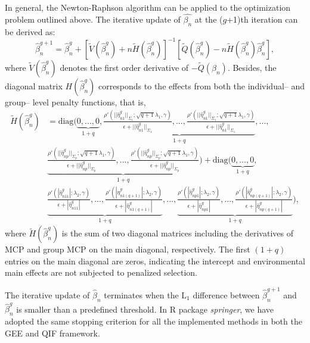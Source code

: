 \documentclass[12pt]{article}
\begin{document}
In general, the Newton-Raphson algorithm can be applied to the optimization problem outlined above. The iterative update of $\hat{\beta_n}$ at the ($g$+1)th iteration can be derived as:
\begin{equation*}
\hat{\beta}_n^{g+1}=\hat{\beta}_n^{g}+[\tilde{V}(\hat{\beta}_n^{g})+n\tilde{H}(\hat{\beta}_n^{g})]^{-1}[\tilde{Q}(\hat{\beta}_n^{g})-n\tilde{H}(\hat{\beta}_n^{g})\hat{\beta}_n^{g}],
\end{equation*}
where  $\tilde{V}(\hat{\beta}_n^{g})$ denotes the first order derivative of $-\tilde{Q}(\beta_n)$. Besides, the diagonal matrix $H(\hat{\beta}_n^{g})$ corresponds to the effects from both the individual-- and group-- level penalty functions, that is,
\begin{equation*}
\begin{aligned}
\tilde{H}(\hat{\beta}_n^{g})&=\text{diag}(\underbrace{0,...,0}_{1+q},\underbrace{\frac{\rho'(||\hat{\eta}_{n1}^{g}||_{\Sigma_{1}};\sqrt{q+1}\lambda_{1},\gamma)}{\epsilon+||\hat{\eta}_{n1}^{g}||_{\Sigma_{1}}},...,\frac{\rho'(||\hat{\eta}_{n1}^{g}||_{\Sigma_{1}};\sqrt{q+1}\lambda_{1},\gamma)}{\epsilon+||\hat{\eta}_{n1}^{g}||_{\Sigma_{1}}}}_{1+q},...,\\ &\underbrace{\frac{\rho'(||\hat{\eta}_{np}^{g}||_{\Sigma_{p}};\sqrt{q+1}\lambda_{1},\gamma)}{\epsilon+||\hat{\eta}_{np}^{g}||_{\Sigma_{p}}},...,\frac{\rho'(||\hat{\eta}_{np}^{g}||_{\Sigma_{p}};\sqrt{q+1}\lambda_{1},\gamma)}{\epsilon+||\hat{\eta}_{np}^{g}||_{\Sigma_{p}}}}_{1+q})+\text{diag}(\underbrace{0,...,0}_{1+q},\\ &\underbrace{\frac{\rho'(|\hat{\eta}_{n11}^{g}|;\lambda_{2},\gamma)}{\epsilon+|\hat{\eta}_{n11}^{g}|},...,\frac{\rho'(|\hat{\eta}_{n1(q+1)}^{g}|;\lambda_{2},\gamma)}{\epsilon+|\hat{\eta}_{n1(q+1)}^{g}|}}_{1+q},...,\underbrace{\frac{\rho'(|\hat{\eta}_{np1}^{g}|;\lambda_{2},\gamma)}{\epsilon+|\hat{\eta}_{np1}^{g}|},...,\frac{\rho'(|\hat{\eta}_{np(q+1)}^{g}|;\lambda_{2},\gamma)}{\epsilon+|\hat{\eta}_{np(q+1)}^{g}|}}_{1+q}),
\end{aligned}
\end{equation*}
where $\tilde{H}(\hat{\beta}_n^{g})$ is the sum of two diagonal matrices including the derivatives of MCP and group MCP on the main diagonal, respectively. The first $(1 + q)$ entries on the main diagonal are zeros, indicating the intercept and environmental main effects are not subjected to penalized selection. 

The iterative update of $\hat{\beta}_n$ terminates when the $\text{L}_1$ difference between $\hat{\beta}_n^{g+1}$ and $\hat{\beta}_n^{g}$ is smaller than a predefined threshold. In R package \emph{springer}, we have adopted the same stopping criterion for all the implemented methods in both the GEE and QIF framework.
\end{document}
